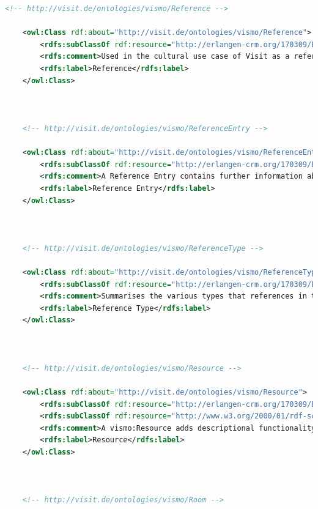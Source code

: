 \begin{lstlisting}[caption={VisMo Ontologie in der letzten (englischen) Version.},label={lst:vismo},captionpos=b,language=xml]
    <!-- http://visit.de/ontologies/vismo/Reference -->

    <owl:Class rdf:about="http://visit.de/ontologies/vismo/Reference">
        <rdfs:subClassOf rdf:resource="http://erlangen-crm.org/170309/E84_Information_Carrier"/>
        <rdfs:comment>Used in the cultural use case of Visit as a reference to various textual information objects that contained further and descriptive information about a given Visit resource.</rdfs:comment>
        <rdfs:label>Reference</rdfs:label>
    </owl:Class>
    


    <!-- http://visit.de/ontologies/vismo/ReferenceEntry -->

    <owl:Class rdf:about="http://visit.de/ontologies/vismo/ReferenceEntry">
        <rdfs:subClassOf rdf:resource="http://erlangen-crm.org/170309/E84_Information_Carrier"/>
        <rdfs:comment>A Reference Entry contains further information about the reference of a vismo:Resource in a given vismo:Reference entity, like the page numbers for example.</rdfs:comment>
        <rdfs:label>Reference Entry</rdfs:label>
    </owl:Class>
    


    <!-- http://visit.de/ontologies/vismo/ReferenceType -->

    <owl:Class rdf:about="http://visit.de/ontologies/vismo/ReferenceType">
        <rdfs:subClassOf rdf:resource="http://erlangen-crm.org/170309/E55_Type"/>
        <rdfs:comment>Summarises the various types that references in the cultural heritage domain can have.</rdfs:comment>
        <rdfs:label>Reference Type</rdfs:label>
    </owl:Class>
    


    <!-- http://visit.de/ontologies/vismo/Resource -->

    <owl:Class rdf:about="http://visit.de/ontologies/vismo/Resource">
        <rdfs:subClassOf rdf:resource="http://erlangen-crm.org/170309/E1_CRM_Entity"/>
        <rdfs:subClassOf rdf:resource="http://www.w3.org/2000/01/rdf-schema#Class"/>
        <rdfs:comment>A vismo:Resource adds descriptional functionality to the resources used in the ViSIT context, therefore adding the possibilities of adding comments, descriptions, as well as literature information to the given resource.</rdfs:comment>
        <rdfs:label>Resource</rdfs:label>
    </owl:Class>
    


    <!-- http://visit.de/ontologies/vismo/Room -->


\end{lstlisting}
